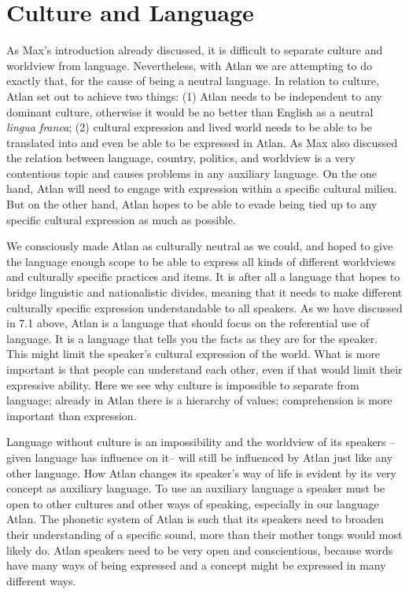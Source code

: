 \section{Culture and Language}


As Max’s introduction already discussed, it is difficult to separate culture and worldview from language. Nevertheless, with Atlan we are attempting to do exactly that, for the cause of being a neutral language. In relation to culture, Atlan set out to achieve two things: (1) Atlan needs to be independent to any dominant culture, otherwise it would be no better than English as a neutral {\it lingua franca}; (2) cultural expression and lived world needs to be able to be translated into and even be able to be expressed in Atlan. As Max also discussed the relation between language, country, politics, and worldview is a very contentious topic and causes problems in any auxiliary language. On the one hand, Atlan will need to engage with expression within a specific cultural milieu. But on the other hand, Atlan hopes to be able to evade being tied up to any specific cultural expression as much as possible.				 		

We consciously made Atlan as culturally neutral as we could, and hoped to give the language enough scope to be able to express all kinds of different worldviews and culturally specific practices and items. It is after all a language that hopes to bridge linguistic and nationalistic divides, meaning that it needs to make different culturally specific expression understandable to all speakers. As we have discussed in 7.1 above, Atlan is a language that should focus on the referential use of language. It is a language that tells you the facts as they are for the speaker. This might limit the speaker's cultural expression of the world. What is more important is that people can understand each other, even if that would limit their expressive ability. Here we see why culture is impossible to separate from language; already in Atlan there is a hierarchy of values; comprehension is more important than expression. 					 

Language without culture is an impossibility and the worldview of its speakers --given language has influence on it-- will still be influenced by Atlan just like any other language. How Atlan changes its speaker's way of life is evident by its very concept as auxiliary language. To use an auxiliary language a speaker must be open to other cultures and other ways of speaking, especially in our language Atlan. The phonetic system of Atlan is such that its speakers need to broaden their understanding of a specific sound, more than their mother tongs would most likely do. Atlan speakers need to be very open and conscientious, because words have many ways of being expressed and a concept might be expressed in many different ways. 									 

